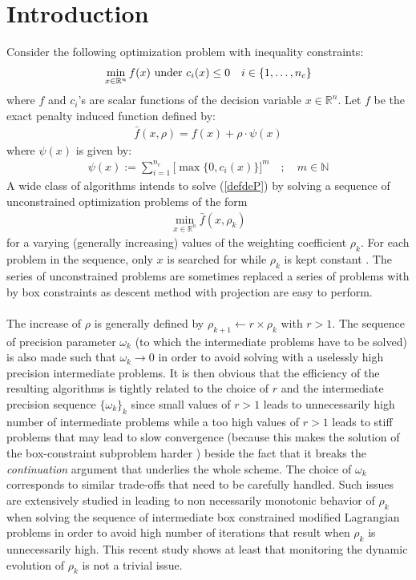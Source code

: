 \documentclass{article}
\begin{document}
\section{Introduction}
\label{secintro}
Consider the following optimization problem with inequality constraints:
\begin{eqnarray}
\min_{x\in \mathbb{R}^{n}} f(x) \ \mbox{\rm under}\ c_i(x)\le 0\quad i\in \{1,\dots,n_c\} \label{defdeP} 
\end{eqnarray} 
where $f$ and $c_i$'s are scalar functions of the decision variable $x\in \mathbb{R}^{n}$. Let $f$ be the exact penalty induced function defined by:
\begin{eqnarray}
\bar f(x,\rho)=f(x)+\rho\cdot \psi(x) \label{defdefxrho} 
\end{eqnarray} 
where $\psi(x)$ is given by:
\begin{eqnarray}
\psi(x):=\sum_{i=1}^{n_c}\bigl[\max\{0,c_i(x)\}\bigr]^m\quad ;\quad m\in \mathbb{N} \label{defdepsi} 
\end{eqnarray} 
A wide class of algorithms intends to solve (\ref{defdeP}) by solving a sequence of unconstrained optimization problems of the form
\begin{eqnarray}
\min_{x\in \mathbb{R}^n} \bar f(x,\rho_k)
\end{eqnarray} 
for a varying (generally increasing) values of the weighting coefficient $\rho_k$. For each problem in the sequence, only $x$ is searched for while $\rho_k$ is kept constant \cite{Byrd:99,Birgin:2012}. The series of unconstrained problems are sometimes replaced a series of problems with by box constraints as descent method with projection are easy to perform. \ \\ \ \\ 
The increase of $\rho$ is generally defined by $\rho_{k+1}\leftarrow r\times \rho_k$ with $r>1$. The sequence of precision parameter $\omega_k$ (to which the intermediate problems have to be solved) is also made such that $\omega_k\rightarrow 0$ in order to avoid solving with a uselessly high precision intermediate problems. It is then obvious that the efficiency of the resulting algorithms is tightly related to the choice of $r$ and the intermediate precision sequence $\{\omega_k\}_k$ since small values of $r>1$ leads to unnecessarily high number of intermediate problems while a too high values of $r>1$ leads to stiff problems that may lead to slow convergence (because this makes the solution of the box-constraint subproblem harder \cite{Birgin:2012}) beside the fact that it breaks the {\em continuation} argument that underlies the whole scheme. The choice of $\omega_k$ corresponds to similar trade-offs that need to be carefully handled. Such issues are extensively studied in \cite{Birgin:2012} leading to non necessarily monotonic behavior of $\rho_k$ when solving the sequence of intermediate box constrained modified Lagrangian problems in order to avoid high number of iterations that result when $\rho_k$ is unnecessarily high. This recent study \cite{Birgin:2012} shows at least that monitoring the dynamic evolution of $\rho_k$ is not a trivial issue.\ \\ \ \\ 
\end{document}
